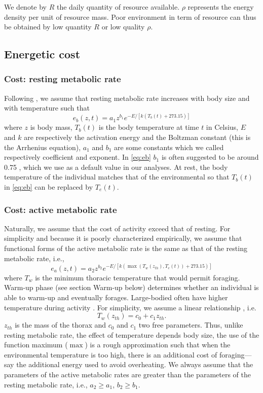 We denote by $R$ the daily quantity of resource available.
$\rho$ represents the energy density per unit of resource mass. 
Poor environment in term of resource can thus be obtained by low quantity $R$ or low quality $\rho$.

\subsection*{Energetic cost}
\subsubsection*{Cost: resting metabolic rate}
Following \citet{Brown2004}, we assume that resting metabolic rate increases with body size and with temperature such that
\begin{equation} \label{eq:eb}
	e_b(z, t) = a_1 z^{b_1} e^{-E/[k (T_b(t)+ 273.15)]}
\end{equation}
where $z$ is body mass, $T_b(t)$ is the body temperature at time $t$ in Celsius, $E$ and $k$ are respectively the activation energy and the Boltzman constant (this is the Arrhenius equation), $a_1$ and $b_1$ are some constants which we called respectively coefficient and exponent.
In \cref{eq:eb} $b_1$ is often suggested to be around 0.75 \citep{Kleiber1947, Peters1986, Brown2004}, which we use as a default value in our analyses.
At rest, the body temperature of the individual matches that of the environmental \citep[e.g.,][]{Bartholomew1978} so that $T_b(t)$ in \cref{eq:eb} can be replaced by $T_e(t)$.

\subsubsection*{Cost: active metabolic rate}
Naturally, we assume that the cost of activity exceed that of resting. 
For simplicity and because it is poorly characterized empirically, we assume that functional forms of the active metabolic rate is the same as that of the resting metabolic rate, i.e., 
\begin{equation} \label{eq:ea}
	e_a(z,t) = a_2 z^{b_2}  e^{-E/[k (\max(T_w(z_{th}), T_e(t))+ 273.15)]}
\end{equation}
where $T_w$ is the minimum thoracic temperature that would permit foraging.
Warm-up phase (see section Warm-up below) determines whether an individual is able to warm-up and eventually forages.
Large-bodied often have higher temperature during activity \citep{Bartholomew1977a}.
For simplicity, we assume a linear relationship \citep{Bartholomew1977a}, i.e.
\begin{equation} \label{eq:Tw}
	T_w(z_{th}) = c_0+ c_1 z_{th}.
\end{equation}
$z_{th}$ is the mass of the thorax and $c_0$ and $c_1$ two free parameters.
Thus, unlike resting metabolic rate, the effect of temperature depends body size, the use of the function maximum ($\max$) is a rough approximation such that when the environmental temperature is too high, there is an additional cost of foraging---say the additional energy used to avoid overheating. 
We always assume that the parameters of the active metabolic rates are greater than the parameters of the resting metabolic rate, i.e.,   $a_2 \geq a_1$, $b_2 \geq b_1$.

